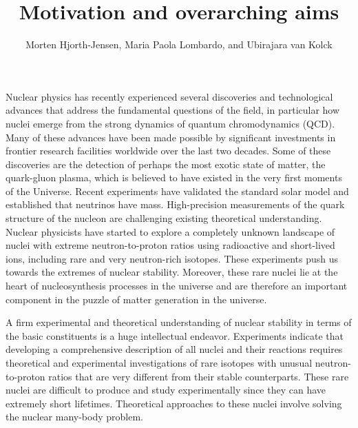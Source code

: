 \title{Motivation and overarching aims}
\author{Morten Hjorth-Jensen, Maria Paola Lombardo, and Ubirajara van Kolck}
\maketitle





Nuclear physics has recently experienced several discoveries and
technological advances that address the fundamental questions of the
field, in particular how nuclei emerge from the strong dynamics
of quantum chromodynamics (QCD).
Many of these advances have been made possible by significant
investments in frontier research facilities worldwide over the last
two decades. Some of these discoveries are the detection of perhaps
the most exotic state of matter, the quark-gluon plasma, which is
believed to have existed in the very first moments of the Universe.  
Recent experiments have validated the standard solar model
and established that neutrinos have mass. High-precision
measurements of the quark structure of the nucleon are challenging
existing theoretical understanding.  Nuclear physicists have started
to explore a completely unknown landscape of nuclei with extreme
neutron-to-proton ratios using radioactive and short-lived ions,
including rare and very neutron-rich isotopes.  These experiments push
us towards the extremes of nuclear stability.  Moreover, these rare
nuclei lie at the heart of nucleosynthesis processes in the universe
and are therefore an important component in the puzzle of matter
generation in the universe.

A firm experimental and theoretical understanding of nuclear stability
in terms of the basic constituents is a huge intellectual endeavor.
Experiments indicate that developing a comprehensive description of
all nuclei and their reactions requires theoretical and experimental
investigations of rare isotopes with unusual neutron-to-proton ratios
that are very different from their stable counterparts.  These rare
nuclei are difficult to produce and study experimentally since they
can have extremely short lifetimes. Theoretical approaches to these
nuclei involve solving the nuclear many-body problem.

